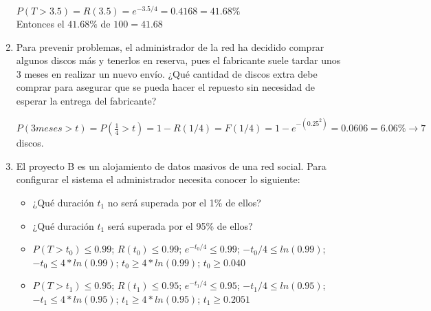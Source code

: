\begin{enumerate}
\begin{tcolorbox}[colback=white,colframe=cyan!50!black,fonttitle=\bfseries]
    $P(T > 3.5) = R(3.5) = e^{-3.5/4}=0.4168 = 41.68\%$\\
    Entonces el $41.68\%$ de $100 = 41.68$
    \end{tcolorbox}
    \item Para prevenir problemas, el administrador de la red ha decidido comprar algunos discos más y tenerlos en reserva, pues el fabricante suele tardar unos 3 meses en realizar un nuevo envío. ¿Qué cantidad de discos extra debe comprar para asegurar que se pueda hacer el repuesto sin necesidad de esperar la entrega del fabricante?
    \begin{tcolorbox}[colback=white,colframe=cyan!50!black,fonttitle=\bfseries]
    $P(3meses>t)=P(\frac{1}{4}>t)=1-R(1/4)=F(1/4)=1-e^{-(0.25^2)}=0.0606=6.06\% \rightarrow 7$ discos.
    \end{tcolorbox}
    \item El proyecto B es un alojamiento de datos masivos de una red social. Para configurar el sistema el administrador necesita conocer lo siguiente: 
    \begin{itemize}
        \item ¿Qué duración $t_1$ no será superada por el 1\% de ellos?
        \item ¿Qué duración $t_1$ será superada por el 95\% de ellos?
    \end{itemize}
    \begin{tcolorbox}[colback=white,colframe=cyan!50!black,fonttitle=\bfseries]
    \begin{itemize}
        \item $P(T>t_0)\leq 0.99$; $R(t_0)\leq 0.99$; $e^{-t_0/4}\leq 0.99$; $-t_0/4 \leq ln(0.99)$; $-t_0 \leq 4*ln(0.99)$; $t_0 \geq 4*ln(0.99)$; $t_0 \geq 0.040$
        \item $P(T>t_1)\leq 0.95$; $R(t_1)\leq 0.95$; $e^{-t_1/4}\leq 0.95$; $-t_1/4 \leq ln(0.95)$; $-t_1 \leq 4*ln(0.95)$; $t_1 \geq 4*ln(0.95)$; $t_1 \geq 0.2051$
    \end{itemize}
    \end{tcolorbox}
\end{enumerate}

